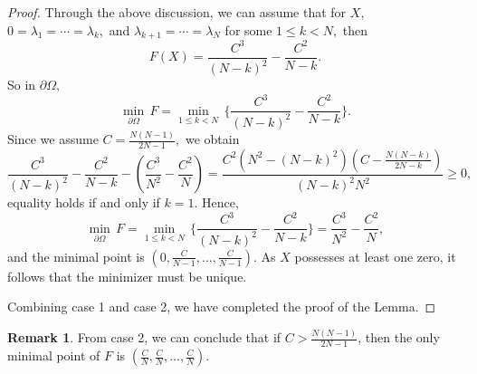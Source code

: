 \documentclass[11pt, reqno]{amsart}
\numberwithin{equation}{section}
\theoremstyle{definition}
\newtheorem{remark}[thm]{Remark}
\begin{document}
\begin{proof}
		Through the above discussion, we can assume that for $X$, $0={\lambda }_1=\cdots ={\lambda }_k,$ and ${\lambda }_{k+1}=\cdots ={\lambda }_N$ for some $1\le k< N,$ then
		\[F(X)=\frac{C^3}{(N-k)^2}-\frac{C^2}{N-k}.\]
		So in $\partial \Omega,$
		$$\underset{\partial \Omega }{\mathop{\min }}\,F=\underset{1\le k< N}{\mathop{\min }}\,\{\frac{C^3}{(N-k)^2} -\frac{C^2}{N-k}\}.$$
		Since we assume $C=\frac{N(N-1)}{2N-1},$ we obtain 
		$$\frac{C^3}{(N-k)^2}-\frac{C^2}{N-k}-(\frac{C^3}{N^2}-\frac{C^2}{N})=\frac{{C^2}(N^2-(N-k)^2)(C-\frac{N(N-k)}{2N-k})}{(N-k)^2N^2}\ge 0,$$
		equality holds if and only if $k=1$. Hence,
		$$\underset{\partial \Omega }{\mathop{\min }}\,F=\underset{1\le k< N}{\mathop{\min }}\,\{\frac{C^3}{(N-k)^2}-\frac{C^2}{N-k}\}=\frac{C^3}{N^2}-\frac{C^2}{N},$$
		and the minimal point is $\left( 0,\frac{C}{N-1},\ldots ,\frac{C}{N-1} \right)$. As $X$ possesses at least one zero, it follows that the minimizer must be unique.
		
		Combining case 1 and case 2, we have completed the proof of the Lemma.
	\end{proof}
	\begin{remark}
		From case 2, we can conclude that if $C>\frac{N(N-1)}{2N-1}$, then the only minimal point of $F$ is $\left( \frac{C}{N},\frac{C}{N},\ldots ,\frac{C}{N} \right)$.
	\end{remark}
	
	
	
\end{document}
